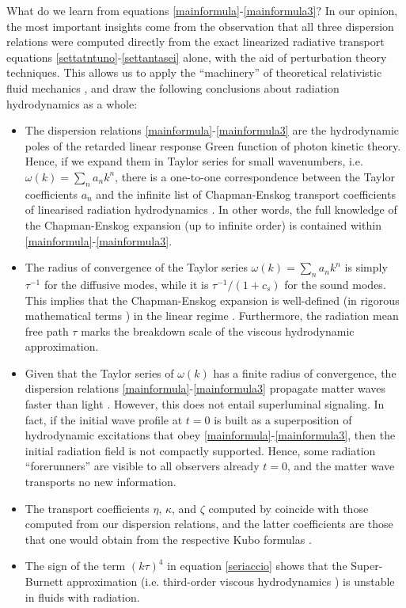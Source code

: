 \documentclass[a4paper, amsfonts, amssymb, amsmath, reprint, showkeys, nofootinbib, twoside,notitlepage,onecolumn]{revtex4-2}
\theoremstyle{definition}
\theoremstyle{theorem}
\theoremstyle{corollary}
\begin{document}
What do we learn from equations \eqref{mainformula}-\eqref{mainformula3}? In our opinion, the most important insights come from the observation that all three dispersion relations were computed directly from the exact linearized radiative transport equations \eqref{settatntuno}-\eqref{settantasei} alone, with the aid of perturbation theory techniques. This allows us to apply the ``machinery'' of theoretical relativistic fluid mechanics \cite{MooreCuts2018mma,Romatschke2017,FlorkowskiReview2018,RochaReview2023ilf}, and draw the following conclusions about radiation hydrodynamics as a whole:
\begin{itemize}
\item The dispersion relations \eqref{mainformula}-\eqref{mainformula3} are the hydrodynamic poles of the retarded linear response Green function of photon kinetic theory. Hence, if we expand them in Taylor series for small wavenumbers, i.e. $\omega(k){=}\sum_n a_n k^n$, there is a one-to-one correspondence between the Taylor coefficients $a_n$ and the infinite list of Chapman-Enskog transport coefficients of linearised radiation hydrodynamics \cite{McLennan1965,Dudynski1989,Struchtrup2011,HellerHydroHedron2023jtd}. In other words, the full knowledge of the Chapman-Enskog expansion (up to infinite order) is contained within \eqref{mainformula}-\eqref{mainformula3}. 
\item The radius of convergence of the Taylor series $\omega(k)=\sum_n a_n k^n$ is simply $\tau^{-1}$ for the diffusive modes, while it is $\tau^{-1}/(1{+}c_s)$ for the sound modes. This implies that the Chapman-Enskog expansion is well-defined (in rigorous mathematical terms \cite{McLennan1965,Dudynski1989}) in the linear regime \cite{GavassinoChapmanEnskog2024xwf}. Furthermore, the radiation mean free path $\tau$ marks the breakdown scale of the viscous hydrodynamic approximation.
\item Given that the Taylor series of $\omega(k)$ has a finite radius of convergence, the dispersion relations \eqref{mainformula}-\eqref{mainformula3} propagate matter waves faster than light \cite{GavassinoDispersion2024}. However, this does not entail superluminal signaling. In fact, if the initial wave profile at $t=0$ is built as a superposition of hydrodynamic excitations that obey \eqref{mainformula}-\eqref{mainformula3}, then the initial radiation field is not compactly supported. Hence, some radiation ``forerunners'' are visible to all observers already $t=0$, and the matter wave transports no new information. 
\item The transport coefficients $\eta$, $\kappa$, and $\zeta$ computed by \citet{Weinberg1971} coincide with those computed from our dispersion relations, and the latter coefficients are those that one would obtain from the respective Kubo formulas \cite{peliti_book,Czajka:2017bod}.
\item The sign of the term $(k\tau)^4 $ in equation \eqref{seriaccio} shows that the Super-Burnett approximation (i.e. third-order viscous hydrodynamics \cite{SuperBurnett1993}) is unstable in fluids with radiation.
\end{itemize}
\end{document}
